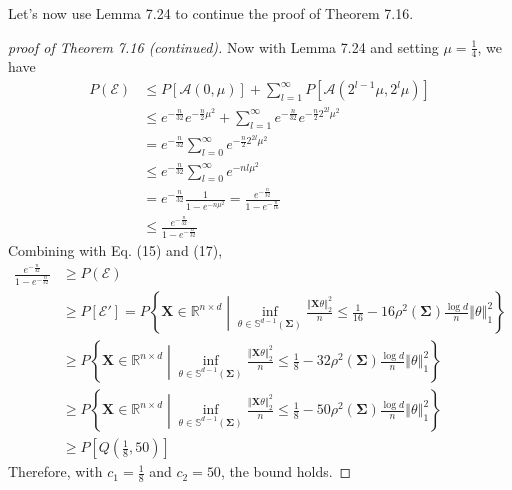 \documentclass[a4paper, 11pt]{article}
\begin{document}
Let's now use Lemma 7.24 to continue the proof of Theorem 7.16. 

\begin{proof}[proof of Theorem 7.16 (continued)]
Now with Lemma 7.24 and setting $\mu = \frac{1}{4}$, we have
\begin{equation}
\begin{split}
P(\mathcal{E}) & \leq P\left[\mathcal{A}(0, \mu)\right] + \sum_{l=1}^\infty P\left[\mathcal{A}(2^{l-1}\mu, 2^l\mu)\right]\\
 & \leq e^{-\frac{n}{32}}e^{-\frac{n}{2}\mu^2} + \sum_{l=1}^\infty e^{-\frac{n}{32}}e^{-\frac{n}{2}2^{2l}\mu^2} \\
 & = e^{-\frac{n}{32}}\sum_{l=0}^\infty e^{-\frac{n}{2}2^{2l}\mu^2}\\
 & \leq e^{-\frac{n}{32}}\sum_{l=0}^\infty e^{-nl\mu^2}\\
 & = e^{-\frac{n}{32}}\frac{1}{1-e^{-n\mu^2}} = \frac{e^{-\frac{n}{32}}}{1-e^{-\frac{n}{16}}}\\
 & \leq \frac{e^{-\frac{n}{32}}}{1-e^{-\frac{n}{32}}}
\end{split}
\end{equation}
Combining with Eq. (15) and (17),
\begin{equation}
\begin{split}
\frac{e^{-\frac{n}{32}}}{1-e^{-\frac{n}{32}}} & \geq P(\mathcal{E})\\
 & \geq P[\mathcal{E}'] = P\left\{\mathbf{X}\in\mathbb{R}^{n\times d} \middle| \inf_{\theta\in\mathbb{S}^{d-1}(\mathbf{\Sigma})} \frac{\left\Vert\mathbf{X}\theta \right\Vert_2^2}{n} \leq \frac{1}{16} - 16\rho^2(\mathbf{\Sigma})\frac{\log d}{n}\left\Vert\theta \right\Vert_1^2 \right\} \\
 & \geq P\left\{\mathbf{X}\in\mathbb{R}^{n\times d} \middle| \inf_{\theta\in\mathbb{S}^{d-1}(\mathbf{\Sigma})} \frac{\left\Vert\mathbf{X}\theta \right\Vert_2^2}{n} \leq \frac{1}{8} - 32\rho^2(\mathbf{\Sigma})\frac{\log d}{n}\left\Vert\theta \right\Vert_1^2 \right\}\\
 & \geq P\left\{\mathbf{X}\in\mathbb{R}^{n\times d} \middle| \inf_{\theta\in\mathbb{S}^{d-1}(\mathbf{\Sigma})} \frac{\left\Vert\mathbf{X}\theta \right\Vert_2^2}{n} \leq \frac{1}{8} - 50\rho^2(\mathbf{\Sigma})\frac{\log d}{n}\left\Vert\theta \right\Vert_1^2 \right\}\\
 & \geq P\left[Q(\frac{1}{8}, 50) \right]
\end{split}
\end{equation}
Therefore, with $c_1=\frac{1}{8}$ and $c_2=50$, the bound holds. 
\end{proof}
\end{document}
